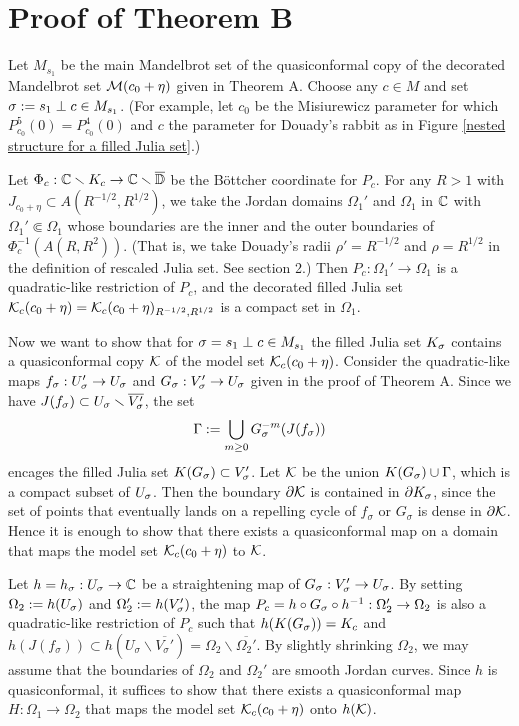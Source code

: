 \setcounter{section}{5}
\section{Proof of Theorem B}
Let $M_{s_1}$ be the main Mandelbrot set of the quasiconformal copy
of the decorated Mandelbrot set ${\mathcal{M}}(c_0+\eta)$ given in Theorem A. 
Choose any $c \in M$ and set $\sigma:=s_1 \perp c \in M_{s_1}$. 
(For example, 
let $c_0$ be the Misiurewicz parameter for which $P_{c_0}^5(0)=P_{c_0}^4(0)$ and $c$ the parameter for Douady's rabbit
as in Figure \ref{nested structure for a filled Julia set}.)


Let $\Phi_{c}:\mathbb C \smallsetminus K_{c} \to \mathbb C  \smallsetminus \overline{\mathbb D}$ be 
the B\"ottcher coordinate for $P_c$. 
For any $R>1$ with 
$J_{c_0 + \eta} \subset A(R^{-1/2}, R^{1/2})$,
we take the Jordan domains 
$\Omega_1'$ and $\Omega_1$ in $\mathbb C$ with $\Omega_1' \Subset \Omega_1$
whose boundaries are the inner and the outer boundaries of
$\Phi_{c}^{-1}(A(R, R^{2}))$.
(That is, we take Douady's radii $\rho'=R^{-1/2}$ and $\rho=R^{1/2}$
in the definition of rescaled Julia set. See section 2.) 
Then $P_{c}:\Omega_1' \to \Omega_1$ is a 
quadratic-like restriction of $P_{c}$, 
and the decorated filled Julia set ${\mathcal{K}}_{c}(c_0+\eta)={\mathcal{K}}_{c}(c_0+\eta)_{R^{-1/2},R^{1/2}}$ 
is a compact set in $\Omega_1$.

Now we want to show that for $\sigma=s_1 \perp c \in M_{s_1}$
the filled Julia set $K_{\sigma}$ contains 
a quasiconformal copy ${\mathcal{K}}$ of the model set ${\mathcal{K}}_{c}(c_0+\eta)$.
Consider the quadratic-like maps
$f_{\sigma}: U_{\sigma}' \to U_{\sigma}$ and $G_{\sigma}: V_{\sigma}' \to U_{\sigma}$ 
given in the proof of Theorem A.
Since we have $J(f_{\sigma}) \subset U_{\sigma}  \smallsetminus  \overline{V_{\sigma}'}$,
the set
$$
{\Gamma}:= \bigcup_{m \ge 0} G_{\sigma}^{-m}(J(f_{\sigma}))
$$
encages the filled Julia set $K(G_{\sigma}) \subset V_{\sigma}'$.
Let ${\mathcal{K}}$ be the union $K(G_{\sigma})  \cup \Gamma$, 
which is a compact subset of $U_{\sigma}$.
Then the boundary $\partial {\mathcal{K}}$ is contained in $\partial K_{\sigma}$,
since the set of points that eventually lands on 
a repelling cycle of $f_\sigma$ or $G_\sigma$
is dense in $\partial {\mathcal{K}}$.
Hence it is enough to show that there exists a 
quasiconformal map on a domain 
that maps the model set ${\mathcal{K}}_{c}(c_0+\eta)$ to ${\mathcal{K}}$.

Let $h=h_{\sigma}:U_{\sigma} \to \mathbb C$ be 
a straightening map of $G_{\sigma}:V_{\sigma}' \to U_{\sigma}$.
By setting $\Omega_2:=h(U_{\sigma})$ and $\Omega_2':=h(V_{{\sigma}}')$,
the map $P_{c}=h \circ G_{\sigma} \circ h^{-1}:\Omega_2' \to \Omega_2$
is also a quadratic-like restriction of $P_{c}$
such that 
$h(K(G_{\sigma}))=K_{c}$ and 
$h(J(f_\sigma)) \subset h(U_\sigma \smallsetminus \overline{V_\sigma'})
=\Omega_2\smallsetminus\overline{\Omega_2'}$.
By slightly shrinking $\Omega_2$, we may assume that 
the boundaries of $\Omega_2$ and $\Omega_2'$ are smooth Jordan curves.
Since $h$ is quasiconformal, 
it suffices to show that there exists a quasiconformal map 
$H:\Omega_1 \to \Omega_2$  
that maps the model set ${\mathcal{K}}_{c}(c_0+\eta)$ 
onto $h({\mathcal{K}})$.

